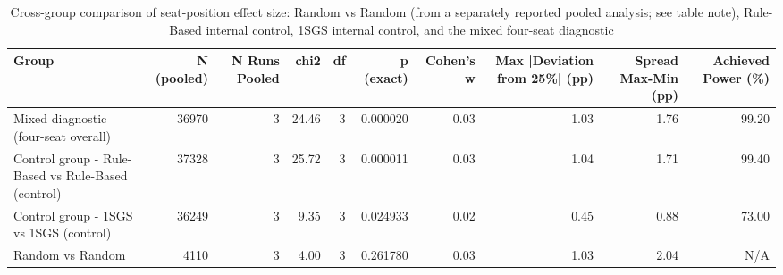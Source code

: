 \begin{table}[htbp]
\centering
\caption{Cross-group comparison of seat-position effect size: Random vs Random (from a separately reported pooled analysis; see table note), Rule-Based internal control, 1SGS internal control, and the mixed four-seat diagnostic}
\label{tab:seat_cross_group}
\begin{tabular}{lrrrrrrrrr}
\toprule
Group & N (pooled) & N Runs Pooled & chi2 & df & p (exact) & Cohen's w & Max |Deviation from 25\%| (pp) & Spread Max-Min (pp) & Achieved Power (\%) \\
\midrule
Mixed diagnostic (four-seat overall) & 36970 & 3 & 24.46 & 3 & 0.000020 & 0.03 & 1.03 & 1.76 & 99.20 \\
Control group - Rule-Based vs Rule-Based (control) & 37328 & 3 & 25.72 & 3 & 0.000011 & 0.03 & 1.04 & 1.71 & 99.40 \\
Control group - 1SGS vs 1SGS (control) & 36249 & 3 & 9.35 & 3 & 0.024933 & 0.02 & 0.45 & 0.88 & 73.00 \\
Random vs Random & 4110 & 3 & 4.00 & 3 & 0.261780 & 0.03 & 1.03 & 2.04 & N/A \\
\bottomrule
\end{tabular}
\end{table}